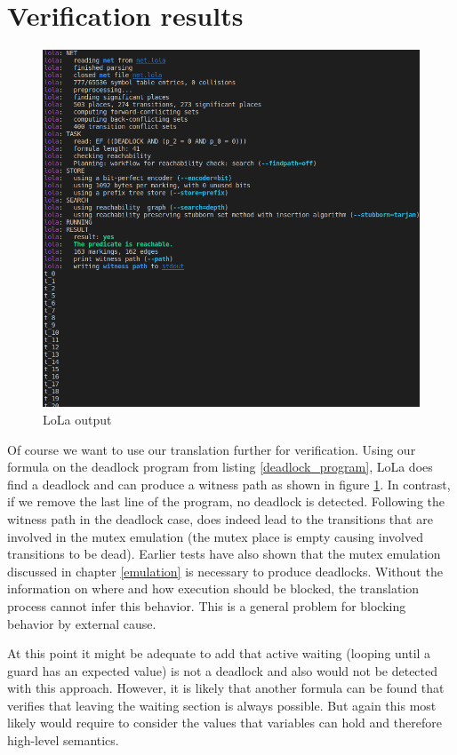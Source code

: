 \section{Verification results}
\begin{figure}
  \centering
  \includegraphics[width=1\textwidth]{./pictures/lola_output.png}
  \caption{LoLa output}
  \label{lola_output}
\end{figure}
Of course we want to use our translation further for verification.
Using our formula on the deadlock program from listing \ref{deadlock_program}, LoLa does find a deadlock and can produce a witness path as shown in figure \ref{lola_output}.
In contrast, if we remove the last line of the program, no deadlock is detected.
Following the witness path in the deadlock case, does indeed lead to the transitions that are involved in the mutex emulation (the mutex place is empty causing involved transitions to be dead).
Earlier tests have also shown that the mutex emulation discussed in chapter \ref{emulation} is necessary to produce deadlocks.
Without the information on where and how execution should be blocked, the translation process cannot infer this behavior.
This is a general problem for blocking behavior by external cause.

At this point it might be adequate to add that active waiting (looping until a guard has an expected value) is not a deadlock and also would not be detected with this approach.
However, it is likely that another formula can be found that verifies that leaving the waiting section is always possible.
But again this most likely would require to consider the values that variables can hold and therefore high-level semantics.

